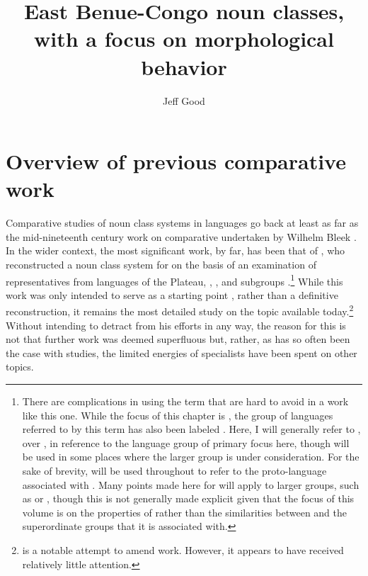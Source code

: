\documentclass[output=paper ,collection	  ,collectionchapter ,biblatexbackend=biber   ]{langscibook}
\author{Jeff Good\affiliation{University at Buffalo}}
\title{East Benue-Congo noun classes, with a focus on morphological behavior}
\begin{document}
\maketitle
\label{sec:2} 

\section{Overview of previous comparative work \label{Overview}}
\label{sec:good:1}
\largerpage[-1]
Comparative studies of noun class systems in  languages go
back at least as far as the mid-nineteenth century work on comparative 
undertaken by Wilhelm Bleek \cite[13--14]{Maho1999}. In the wider 
context, the most significant work, by far, has been that of
, who reconstructed a noun class system for
 on the basis of an examination of representatives from
languages of the Plateau, , , and  subgroups
\cite[19--20]{deWolf1971}.{\footnote{There are complications in using the term 
that are hard to avoid in a work like this one. While the focus of this chapter
is , the group of languages referred to by this term has also
been labeled  \cite[30--31]{WilliamsonB2000}. Here, I will generally
refer to , over , in reference to the language
group of primary focus here, though  will be used in some places
where the larger group is under consideration. For the sake of brevity,
 will be used throughout to refer to the proto-language
associated with . Many points made here for  
will apply to larger groups, such as  or ,
though this is not generally made explicit given that the focus of this volume
is on the properties of  rather than the similarities between
 and the superordinate groups that it is associated with.}}
While this work was only intended to serve as a starting point
\cite[21]{deWolf1971}, rather than a definitive reconstruction, it remains the
most detailed study on the topic available
today.{\footnote{ is a notable attempt to amend
 work. However, it appears to have received relatively
little attention.}} Without intending to detract from his efforts in any way,
the reason for this is not that further work was deemed superfluous but, rather,
as has so often been the case with  studies, the limited energies of
specialists have been spent on other topics.
\end{document}
